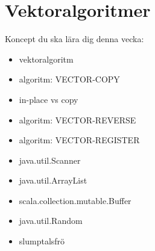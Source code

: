 \chapter{Vektoralgoritmer}\label{chapter:W05}
Koncept du ska lära dig denna vecka:
\begin{multicols}{2}\begin{itemize}[nosep,label={$\square$},leftmargin=*]
\item vektoralgoritm
\item algoritm: VECTOR-COPY
\item in-place vs copy
\item algoritm: VECTOR-REVERSE
\item algoritm: VECTOR-REGISTER
\item java.util.Scanner
\item java.util.ArrayList
\item scala.collection.mutable.Buffer
\item java.util.Random
\item slumptalsfrö\end{itemize}\end{multicols}
